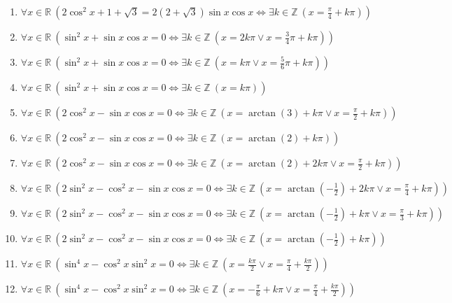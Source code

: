\documentclass[11pt,a4paper]{article}
\begin{document}
\begin{enumerate}
\item $\displaystyle \forall x \in \mathbb{R}\ \left( 2\cos^{2} x + 1 + \sqrt{3} = 2(2 + \sqrt{3})\sin x \cos x \iff \exists k \in \mathbb{Z}\ \left( x = \frac{\pi}{4} + k\pi \right) \right)$
\item $\displaystyle \forall x \in \mathbb{R}\ \left( \sin^{2} x + \sin x \cos x = 0 \iff \exists k \in \mathbb{Z}\ \left( x = 2k\pi \lor x = \frac{3}{4}\pi + k\pi \right) \right)$
\item $\displaystyle \forall x \in \mathbb{R}\ \left( \sin^{2} x + \sin x \cos x = 0 \iff \exists k \in \mathbb{Z}\ \left( x = k\pi \lor x = \frac{5}{6}\pi + k\pi \right) \right)$
\item $\displaystyle \forall x \in \mathbb{R}\ \left( \sin^{2} x + \sin x \cos x = 0 \iff \exists k \in \mathbb{Z}\ \left( x = k\pi \right) \right)$
\item $\displaystyle \forall x \in \mathbb{R}\ \left( 2\cos^{2} x - \sin x \cos x = 0 \iff \exists k \in \mathbb{Z}\ \left( x = \arctan\left(3\right) + k\pi \lor x = \frac{\pi}{2} + k\pi \right) \right)$
\item $\displaystyle \forall x \in \mathbb{R}\ \left( 2\cos^{2} x - \sin x \cos x = 0 \iff \exists k \in \mathbb{Z}\ \left( x = \arctan\left(2\right) + k\pi \right) \right)$
\item $\displaystyle \forall x \in \mathbb{R}\ \left( 2\cos^{2} x - \sin x \cos x = 0 \iff \exists k \in \mathbb{Z}\ \left( x = \arctan\left(2\right) + 2k\pi \lor x = \frac{\pi}{2} + k\pi \right) \right)$
\item $\displaystyle \forall x \in \mathbb{R}\ \left( 2\sin^{2} x - \cos^{2} x - \sin x \cos x = 0 \iff \exists k \in \mathbb{Z}\ \left( x = \arctan\left(-\frac{1}{2}\right) + 2k\pi \lor x = \frac{\pi}{4} + k\pi \right) \right)$
\item $\displaystyle \forall x \in \mathbb{R}\ \left( 2\sin^{2} x - \cos^{2} x - \sin x \cos x = 0 \iff \exists k \in \mathbb{Z}\ \left( x = \arctan\left(-\frac{1}{2}\right) + k\pi \lor x = \frac{\pi}{3} + k\pi \right) \right)$
\item $\displaystyle \forall x \in \mathbb{R}\ \left( 2\sin^{2} x - \cos^{2} x - \sin x \cos x = 0 \iff \exists k \in \mathbb{Z}\ \left( x = \arctan\left(-\frac{1}{2}\right) + k\pi \right) \right)$
\item $\displaystyle \forall x \in \mathbb{R}\ \left( \sin^{4} x - \cos^{2} x \sin^{2} x = 0 \iff \exists k \in \mathbb{Z}\ \left( x = \frac{k\pi}{2} \lor x = \frac{\pi}{4} + \frac{k\pi}{2} \right) \right)$
\item $\displaystyle \forall x \in \mathbb{R}\ \left( \sin^{4} x - \cos^{2} x \sin^{2} x = 0 \iff \exists k \in \mathbb{Z}\ \left( x = -\frac{\pi}{6} + k\pi \lor x = \frac{\pi}{4} + \frac{k\pi}{2} \right) \right)$

\end{enumerate}
\end{document}
